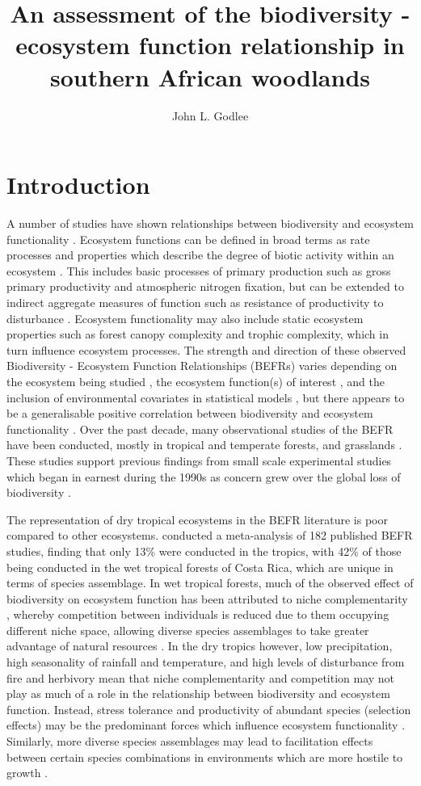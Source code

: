 \documentclass[11pt,a4paper]{article}
\title{An assessment of the biodiversity - ecosystem function relationship in southern African woodlands}
\author{John L. Godlee}
\date{}
\begin{document}
\maketitle
\tableofcontents

\section{Introduction}

A number of studies have shown relationships between biodiversity and ecosystem functionality \citep{Review}. Ecosystem functions can be defined in broad terms as rate processes and properties which describe the degree of biotic activity within an ecosystem \citep{Jax2005}. This includes basic processes of primary production such as gross primary productivity and atmospheric nitrogen fixation, but can be extended to indirect aggregate measures of function such as resistance of productivity to disturbance \citep{}. Ecosystem functionality may also include static ecosystem properties such as forest canopy complexity and trophic complexity, which in turn influence ecosystem processes. The strength and direction of these observed Biodiversity - Ecosystem Function Relationships (BEFRs) varies depending on the ecosystem being studied \citep{}, the ecosystem function(s) of interest \citep{}, and the inclusion of environmental covariates in statistical models \citep{}, but there appears to be a generalisable positive correlation between biodiversity and ecosystem functionality \citep{Liang2016}. Over the past decade, many observational studies of the BEFR have been conducted, mostly in tropical and temperate forests, and grasslands \citep{Chen2011}. These studies support previous findings from small scale experimental studies which began in earnest during the 1990s as concern grew over the global loss of biodiversity \citep{Tilman1994, Tilman2014}.

The representation of dry tropical ecosystems in the BEFR literature is poor compared to other ecosystems. \citet{Clarke2017} conducted a meta-analysis of 182 published BEFR studies, finding that only 13\% were conducted in the tropics, with 42\% of those being conducted in the wet tropical forests of Costa Rica, which are unique in terms of species assemblage. In wet tropical forests, much of the observed effect of biodiversity on ecosystem function has been attributed to niche complementarity \citep{}, whereby competition between individuals is reduced due to them occupying different niche space, allowing diverse species assemblages to take greater advantage of natural resources \citep{}. In the dry tropics however, low precipitation, high seasonality of rainfall and temperature, and high levels of disturbance from fire and herbivory mean that niche complementarity and competition may not play as much of a role in the relationship between biodiversity and ecosystem function. Instead, stress tolerance and productivity of abundant species (selection effects) may be the predominant forces which influence ecosystem functionality \citep{}. Similarly, more diverse species assemblages may lead to facilitation effects between certain species combinations in environments which are more hostile to growth \citep{}.
\end{document}
